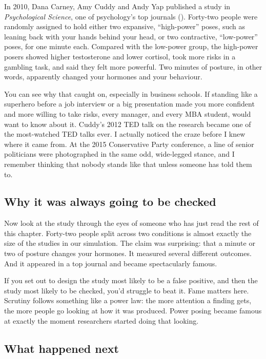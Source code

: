 \documentclass[
]{book}
\begin{document}
In 2010, Dana Carney, Amy Cuddy and Andy Yap published a study in \emph{Psychological Science}, one of psychology's top journals (). Forty-two people were randomly assigned to hold either two expansive, ``high-power'' poses, such as leaning back with your hands behind your head, or two contractive, ``low-power'' poses, for one minute each. Compared with the low-power group, the high-power posers showed higher testosterone and lower cortisol, took more risks in a gambling task, and said they felt more powerful. Two minutes of posture, in other words, apparently changed your hormones and your behaviour.

You can see why that caught on, especially in business schools. If standing like a superhero before a job interview or a big presentation made you more confident and more willing to take risks, every manager, and every MBA student, would want to know about it. Cuddy's 2012 TED talk on the research became one of the most-watched TED talks ever. I actually noticed the craze before I knew where it came from. At the 2015 Conservative Party conference, a line of senior politicians were photographed in the same odd, wide-legged stance, and I remember thinking that nobody stands like that unless someone has told them to.

\subsection{Why it was always going to be checked}\label{why-it-was-always-going-to-be-checked}

Now look at the study through the eyes of someone who has just read the rest of this chapter. Forty-two people split across two conditions is almost exactly the size of the studies in our simulation. The claim was surprising: that a minute or two of posture changes your hormones. It measured several different outcomes. And it appeared in a top journal and became spectacularly famous.

If you set out to design the study most likely to be a false positive, and then the study most likely to be checked, you'd struggle to beat it. Fame matters here. Scrutiny follows something like a power law: the more attention a finding gets, the more people go looking at how it was produced. Power posing became famous at exactly the moment researchers started doing that looking.

\subsection{What happened next}\label{what-happened-next}
\end{document}
